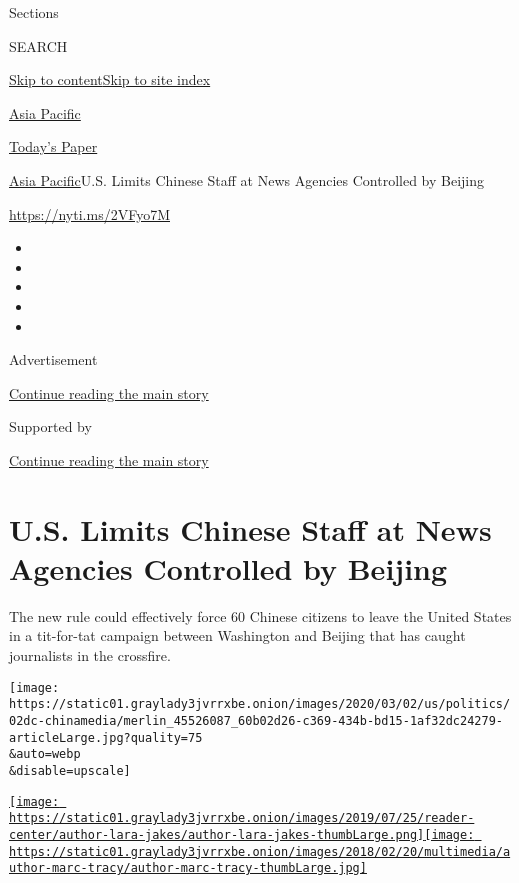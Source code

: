 Sections

SEARCH

\protect\hyperlink{site-content}{Skip to
content}\protect\hyperlink{site-index}{Skip to site index}

\href{https://www.nytimes3xbfgragh.onion/section/world/asia}{Asia
Pacific}

\href{https://myaccount.nytimes3xbfgragh.onion/auth/login?response_type=cookie\&client_id=vi}{}

\href{https://www.nytimes3xbfgragh.onion/section/todayspaper}{Today's
Paper}

\href{/section/world/asia}{Asia Pacific}\textbar{}U.S. Limits Chinese
Staff at News Agencies Controlled by Beijing

\url{https://nyti.ms/2VFyo7M}

\begin{itemize}
\item
\item
\item
\item
\item
\end{itemize}

Advertisement

\protect\hyperlink{after-top}{Continue reading the main story}

Supported by

\protect\hyperlink{after-sponsor}{Continue reading the main story}

\hypertarget{us-limits-chinese-staff-at-news-agencies-controlled-by-beijing}{%
\section{U.S. Limits Chinese Staff at News Agencies Controlled by
Beijing}\label{us-limits-chinese-staff-at-news-agencies-controlled-by-beijing}}

The new rule could effectively force 60 Chinese citizens to leave the
United States in a tit-for-tat campaign between Washington and Beijing
that has caught journalists in the crossfire.

\texttt{[image: https://static01.graylady3jvrrxbe.onion/images/2020/03/02/us/politics/02dc-chinamedia/merlin\_45526087\_60b02d26-c369-434b-bd15-1af32dc24279-articleLarge.jpg?quality=75\\\&auto=webp\\\&disable=upscale]}

\href{https://www.nytimes3xbfgragh.onion/by/lara-jakes}{\texttt{[image: https://static01.graylady3jvrrxbe.onion/images/2019/07/25/reader-center/author-lara-jakes/author-lara-jakes-thumbLarge.png]}}\href{https://www.nytimes3xbfgragh.onion/by/marc-tracy}{\texttt{[image: https://static01.graylady3jvrrxbe.onion/images/2018/02/20/multimedia/author-marc-tracy/author-marc-tracy-thumbLarge.jpg]}}

